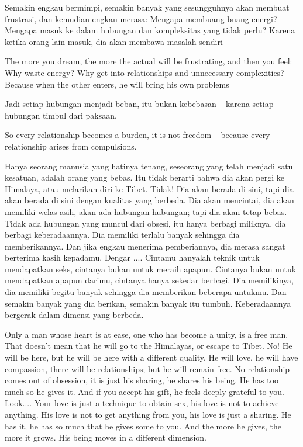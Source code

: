 \bahasa
Semakin engkau bermimpi, semakin banyak yang sesungguhnya akan membuat frustrasi, dan kemudian engkau merasa: Mengapa membuang-buang energi? Mengapa masuk ke dalam hubungan dan kompleksitas yang tidak perlu? Karena ketika orang lain masuk, dia akan membawa masalah sendiri

\english
The more you dream, the more the actual will be frustrating, and then you feel: Why waste energy? Why get into relationships and unnecessary complexities? Because when the other enters, he will bring his own problems

\bahasa
Jadi setiap hubungan menjadi beban, itu bukan kebebasan -- karena setiap hubungan timbul dari paksaan.

\english
So every relationship becomes a burden, it is not freedom -- because every relationship arises from compulsions.

\bahasa
Hanya seorang manusia yang hatinya tenang, seseorang yang telah menjadi satu kesatuan, adalah orang yang bebas. Itu tidak berarti bahwa dia akan pergi ke Himalaya, atau melarikan diri ke Tibet. Tidak! Dia akan berada di sini, tapi dia akan berada di sini dengan kualitas yang berbeda. Dia akan mencintai, dia akan memiliki welas asih, akan ada hubungan-hubungan; tapi dia akan tetap bebas. Tidak ada hubungan yang muncul dari obsesi, itu hanya berbagi miliknya, dia berbagi keberadaannya. Dia memiliki terlalu banyak sehingga dia memberikannya. Dan jika engkau menerima pemberiannya, dia merasa sangat berterima kasih kepadamu. Dengar .... Cintamu hanyalah teknik untuk mendapatkan seks, cintanya bukan untuk meraih apapun. Cintanya bukan untuk mendapatkan apapun darimu, cintanya hanya sekedar berbagi. Dia memilikinya, dia memiliki begitu banyak sehingga dia memberikan beberapa untukmu. Dan semakin banyak yang dia berikan, semakin banyak itu tumbuh. Keberadaannya bergerak dalam dimensi yang berbeda.

\english
Only a man whose heart is at ease, one who has become a unity, is a free man. That doesn't mean that he will go to the Himalayas, or escape to Tibet. No! He will be here, but he will be here with a different quality. He will love, he will have compassion, there will be relationships; but he will remain free. No relationship comes out of obsession, it is just his sharing, he shares his being. He has too much so he gives it. And if you accept his gift, he feels deeply grateful to you. Look.... Your love is just a technique to obtain sex, his love is not to achieve anything. His love is not to get anything from you, his love is just a sharing. He has it, he has so much that he gives some to you. And the more he gives, the more it grows. His being moves in a different dimension.

